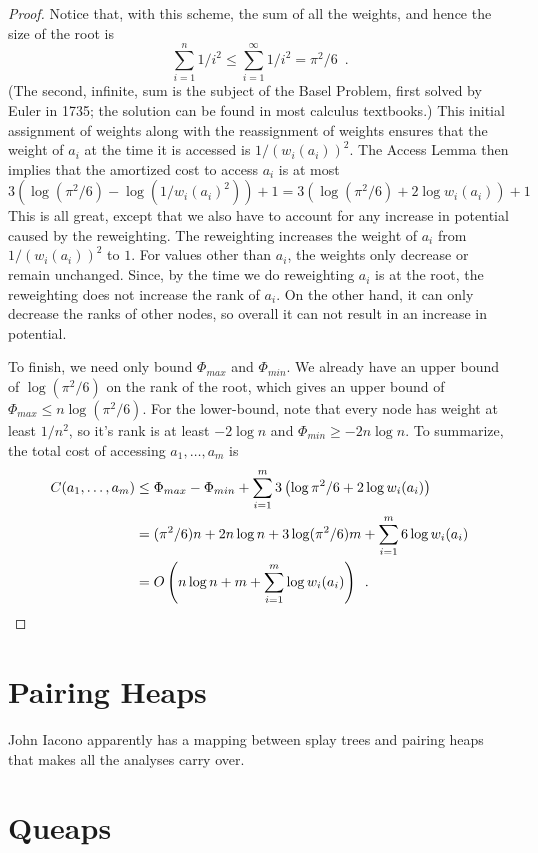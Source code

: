 {\begin{proof}
Notice that, with this scheme, the sum of all the weights, and hence the size of the root is
\[
    \sum_{i=1}^n 1/i^2 \le \sum_{i=1}^\infty 1/i^2 = \pi^2/6 \enspace .
\]
(The second, infinite, sum is the subject of the Basel Problem, first solved by Euler in 1735;  the solution can be found in most calculus
textbooks.)  This initial assignment of weights along with the reassignment
of weights ensures that the weight of $a_i$ at the time it is accessed
is $1/(w_i(a_i))^2$.  The Access Lemma then implies that the amortized
cost to access $a_i$ is at most
\[
   3(\log(\pi^2/6) - \log(1/w_i(a_i)^2)) + 1 
   = 3(\log(\pi^2/6) + 2\log w_i(a_i)) + 1
\]
This is all great, except that we also have to account for any increase in potential caused by the reweighting. The reweighting increases the weight of $a_i$ from $1/(w_i(a_i))^2$ to $1$. For values other than $a_i$, the weights only decrease or remain unchanged.  Since, by the time we do reweighting $a_i$ is at the root, the reweighting does not increase the rank of $a_i$.  On the other hand, it can only decrease the ranks of other nodes, so overall it can not result in an increase in potential.

To finish, we need only bound $\Phi_{max}$ and $\Phi_{min}$.  We already have an upper bound of $\log (\pi^2/6)$ on the rank of the root, which gives an upper bound of $\Phi_{max}\le n\log (\pi^2/6)$.  For the lower-bound, note that every node has weight at least $1/n^2$, so it's rank is at least $-2\log n$ and $\Phi_{min}\ge -2n\log n$.  To summarize, the total cost of accessing $a_1,\ldots,a_m$ is
\begin{align*}
   C(a_1,\ldots,a_m) & \le 
   \Phi_{max} - \Phi_{min} + \sum_{i=1}^m 3\left(\log\pi^2/6 + 2\log w_i(a_i)\right) \\
   & = (\pi^2/6)n + 2n\log n + 3\log(\pi^2/6)m + \sum_{i=1}^m 6\log w_i(a_i) \\
  & = O\left(n\log n + m + \sum_{i=1}^m \log w_i(a_i)\right) \enspace .\qedhere
\end{align*}

\end{proof}

\section{Pairing Heaps}

John Iacono apparently has a mapping between splay trees and pairing
heaps that makes all the analyses carry over.

\section{Queaps}

}
